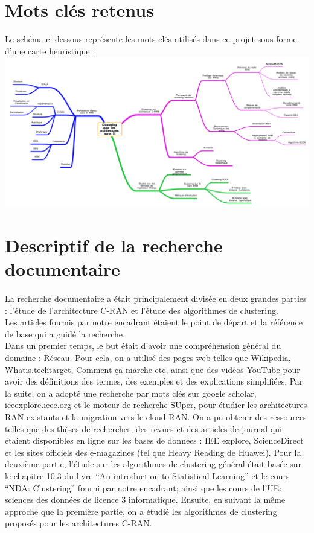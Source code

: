 \documentclass{article}
\begin{document}
\section{Mots clés retenus}
\begin{flushleft}
Le schéma ci-dessous représente les mots clés utilisés dans ce projet sous forme d'une carte heuristique :\\
\includegraphics[width=38em]{motcle.png}\\[1.5cm]
\end{flushleft}
\section{Descriptif de la recherche documentaire}
\paragraph{}
La recherche documentaire a était principalement divisée en deux grandes parties : 
l'étude de l'architecture C-RAN et l'étude des algorithmes de clustering.\\
Les articles fournis par notre encadrant étaient le point de départ et la référence 
de base qui a guidé la recherche. \\
Dans un premier temps, le but était d’avoir une compréhension général du domaine : Réseau. 
Pour cela, on a utilisé des pages web telles que Wikipedia, Whatis.techtarget, Comment ça marche 
etc, ainsi que des vidéos YouTube pour avoir des définitions des termes, des exemples et des 
explications simplifiées. Par la suite, on a adopté une recherche par mots clés sur google 
scholar, ieeexplore.ieee.org et le moteur de recherche SUper, pour étudier les architectures 
RAN existants et la migration vers le cloud-RAN. On a pu obtenir des ressources telles 
que des thèses de recherches, des revues et des articles de journal qui étaient disponibles en ligne sur les bases de 
données : IEE explore, ScienceDirect et les sites officiels des e-magazines (tel que Heavy Reading de Huawei).
Pour la deuxième partie, l’étude sur les algorithmes de clustering général était basée sur le chapitre 10.3 du livre 
“An introduction to Statistical Learning” et le cours “NDA: Clustering” fourni par notre encadrant; ainsi que les cours de 
l'UE: sciences des données de licence 3 informatique. Ensuite, en suivant la même approche que la première partie, on a 
étudié les algorithmes de clustering proposés pour les architectures C-RAN.
\end{document}

